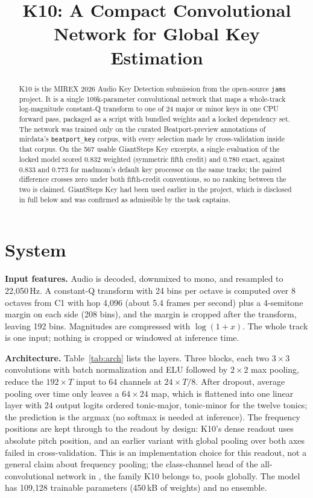 \documentclass{article}
\title{K10: A Compact Convolutional Network for Global Key Estimation}
\begin{document}
\maketitle

\begin{abstract}
K10 is the MIREX 2026 Audio Key Detection submission from the open-source \texttt{jams}
project. It is a single 109k-parameter convolutional network that maps a whole-track
log-magnitude constant-Q transform to one of 24 major or minor keys in one CPU forward
pass, packaged as a script with bundled weights and a locked dependency set. The network
was trained only on the curated Beatport-preview annotations of mirdata's
\texttt{beatport\_key} corpus, with every selection made by cross-validation inside that
corpus. On the 567 usable GiantSteps Key excerpts, a single evaluation of the locked
model scored 0.832 weighted (symmetric fifth credit) and 0.780 exact, against 0.833 and
0.773 for madmom's default key processor on the same tracks; the paired difference
crosses zero under both fifth-credit conventions, so no ranking between the two is
claimed. GiantSteps Key had been used earlier in the project, which is disclosed in
full below and was confirmed as admissible by the task captains.
\end{abstract}

\section{System}
\label{sec:system}

\textbf{Input features.} Audio is decoded, downmixed to mono, and resampled to
22{,}050\,Hz. A constant-Q transform with 24 bins per octave is computed over 8 octaves
from C1 with hop 4{,}096 (about 5.4 frames per second) plus a 4-semitone margin on each
side (208 bins), and the margin is cropped after the transform, leaving 192 bins.
Magnitudes are compressed with $\log(1+x)$. The whole track is one input; nothing is
cropped or windowed at inference time.

\textbf{Architecture.} Table~\ref{tab:arch} lists the layers. Three blocks, each two
$3{\times}3$ convolutions with batch normalization and ELU followed by $2{\times}2$
max pooling, reduce the $192{\times}T$ input to $64$ channels at $24{\times}T/8$. After
dropout, average pooling over time only leaves a $64{\times}24$ map, which is flattened
into one linear layer with 24 output logits ordered tonic-major, tonic-minor for the
twelve tonics; the prediction is the argmax (no softmax is needed at inference). The
frequency positions are kept through to the readout by design: K10's dense readout uses
absolute pitch position, and an earlier variant with global pooling over both axes
failed in cross-validation. This is an implementation choice for this readout, not a
general claim about frequency pooling; the class-channel head of the all-convolutional
network in \cite{korzeniowski2018genre}, the family K10 belongs to, pools globally.
The model has 109{,}128 trainable parameters (450\,kB of weights) and no ensemble.
\end{document}
